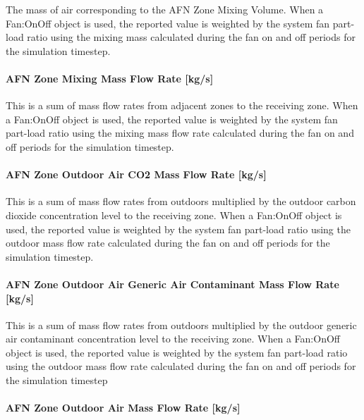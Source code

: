 The mass of air corresponding to the AFN Zone Mixing Volume. When a Fan:OnOff object is used, the reported value is weighted by the system fan part-load ratio using the mixing mass calculated during the fan on and off periods for the simulation timestep.

\paragraph{AFN Zone Mixing Mass Flow Rate {[}kg/s{]}}\label{afn-zone-mixing-mass-flow-rate-kgs}

This is a sum of mass flow rates from adjacent zones to the receiving zone. When a Fan:OnOff object is used, the reported value is weighted by the system fan part-load ratio using the mixing mass flow rate calculated during the fan on and off periods for the simulation timestep.

\paragraph{AFN Zone Outdoor Air CO2 Mass Flow Rate {[}kg/s{]}}\label{afn-zone-outdoor-air-co2-mass-flow-rate-kgs}

This is a sum of mass flow rates from outdoors multiplied by the outdoor carbon dioxide concentration level to the receiving zone. When a Fan:OnOff object is used, the reported value is weighted by the system fan part-load ratio using the outdoor mass flow rate calculated during the fan on and off periods for the simulation timestep.

\paragraph{AFN Zone Outdoor Air Generic Air Contaminant Mass Flow Rate {[}kg/s{]}}\label{afn-zone-outdoor-air-generic-air-contaminant-mass-flow-rate-kgs}

This is a sum of mass flow rates from outdoors multiplied by the outdoor generic air contaminant concentration level to the receiving zone. When a Fan:OnOff object is used, the reported value is weighted by the system fan part-load ratio using the outdoor mass flow rate calculated during the fan on and off periods for the simulation timestep

\paragraph{AFN Zone Outdoor Air Mass Flow Rate {[}kg/s{]}}\label{afn-zone-outdoor-air-mass-flow-rate-kgs}

